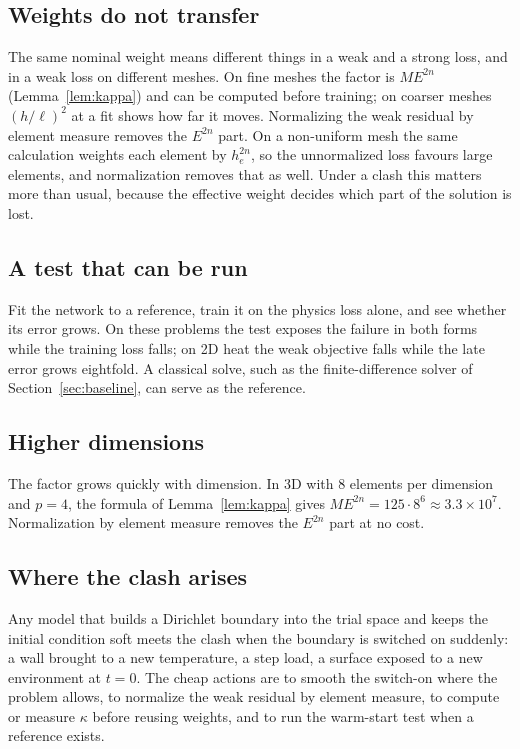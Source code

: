 \documentclass[a4paper,fleqn]{cas-sc}
\begin{document}
\subsection{Weights do not transfer}
The same nominal weight means different things in a weak and a strong loss, and in a
weak loss on different meshes. On fine meshes the factor is $ME^{2n}$ (Lemma~\ref{lem:kappa}) and can be computed before
training; on coarser meshes $(h/\ell)^2$ at a fit shows how far it moves. Normalizing the weak residual by element
measure removes the $E^{2n}$ part. On a non-uniform mesh the same calculation weights each element by $h_e^{2n}$, so the
unnormalized loss favours large elements, and normalization removes that as well. Under a clash this matters more than usual, because the effective weight decides which
part of the solution is lost.

\subsection{A test that can be run}
Fit the network to a reference, train it on the physics loss alone, and see whether its
error grows. On these problems the test exposes the failure in both forms while the training loss falls; on 2D heat the
weak objective falls while the late error grows eightfold. A classical solve, such as the finite-difference solver of
Section~\ref{sec:baseline}, can serve as the reference.

\subsection{Higher dimensions}
The factor grows quickly with dimension. In 3D with $8$ elements per dimension and $p=4$,
the formula of Lemma~\ref{lem:kappa} gives $ME^{2n}=125\cdot8^6\approx3.3\times10^7$. Normalization by element measure removes the $E^{2n}$ part at
no cost.

\subsection{Where the clash arises}
Any model that builds a Dirichlet boundary into the trial space and keeps the initial
condition soft meets the clash when the boundary is switched on suddenly: a wall brought to a new temperature, a step
load, a surface exposed to a new environment at $t=0$. The cheap actions are to smooth the switch-on where the problem
allows, to normalize the weak residual by element measure, to compute or measure $\kappa$ before reusing weights, and to
run the warm-start test when a reference exists.
\end{document}
